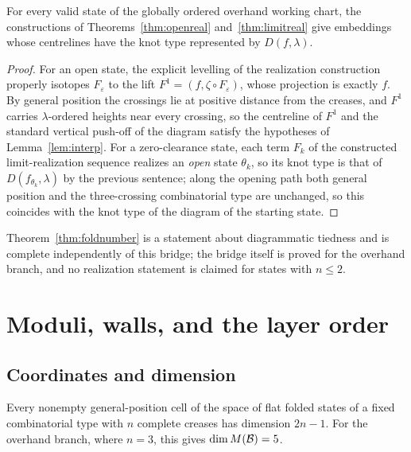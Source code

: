 \begin{proposition}\label{prop:bridge}
For every valid state of the globally ordered overhand working chart, the constructions of Theorems~\ref{thm:openreal} and~\ref{thm:limitreal} give embeddings whose centrelines have the knot type represented by $D(f,\lambda)$.
\end{proposition}

\begin{proof}
For an open state, the explicit levelling of the realization construction properly isotopes $F_\varepsilon$ to the lift $F^1=(f,\zeta\circ F_\varepsilon)$, whose projection is exactly $f$. By general position the crossings lie at positive distance from the creases, and $F^1$ carries $\lambda$-ordered heights near every crossing, so the centreline of $F^1$ and the standard vertical push-off of the diagram satisfy the hypotheses of Lemma~\ref{lem:interp}. For a zero-clearance state, each term $F_k$ of the constructed limit-realization sequence realizes an \emph{open} state $\theta_k$, so its knot type is that of $D(f_{\theta_k},\lambda)$ by the previous sentence; along the opening path both general position and the three-crossing combinatorial type are unchanged, so this coincides with the knot type of the diagram of the starting state.
\end{proof}

Theorem~\ref{thm:foldnumber} is a statement about diagrammatic tiedness and is complete independently of this bridge; the bridge itself is proved for the overhand branch, and no realization statement is claimed for states with $n\le2$.

\section{Moduli, walls, and the layer order}\label{sec:moduli}

\subsection{Coordinates and dimension}

\begin{proposition}[Dimension]\label{prop:dim}
Every nonempty general-position cell of the space of flat folded states of a fixed combinatorial type with $n$ complete creases has dimension $2n-1$. For the overhand branch, where $n=3$, this gives $\dim M(\mathcal{B})=5$.
\end{proposition}

